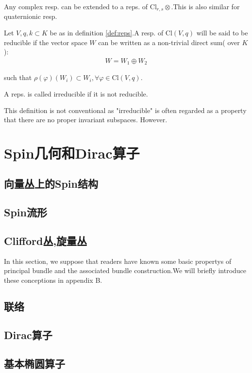     Any complex resp. can be extended to a reps. of $\mathrm{Cl}_{r,s}\otimes $.This is also similar for quaternionic resp.


\begin{definition}
   Let $V,q,k \subset K$ be as in definition \ref{def:reps}.A resp. of $\mathrm{Cl}(V,q)$ will be said to be reducible if the vector space $W$ can be written as a non-trivial direct sum( over $K$):
   \begin{align*}
    W=W_1 \oplus W_2
   \end{align*}

   such that $\rho(\varphi)(W_i)\subset W_i, \forall \varphi \in \mathrm{Cl}(V,q)$.

   A reps. is called irreducible if it is not reducible.
\end{definition}
  


This definition is not conventional as "irreducible" is often regarded as a property that there are no proper invariant subspaces. However.

\chapter{Spin几何和Dirac算子}



\section{向量丛上的Spin结构}
\section{Spin流形}
\section{Clifford丛,旋量丛}
In this section, we suppose that readers have known some basic propertys of principal bundle and the associated bundle construction.We will briefly introduce these conceptions in appendix B.




\section{联络}
\section{Dirac算子}
\section{基本椭圆算子}
